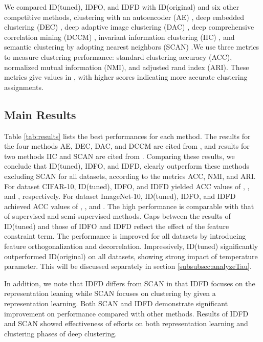 \documentclass{article} \usepackage{iclr2021_conference,times}
\begin{document}
We compared ID(tuned), IDFO, and IDFD with ID(original) and six other competitive methods, clustering with an autoencoder (AE) \cite{hinton2006reducing}, deep embedded clustering (DEC) \cite{DEC}, deep adaptive image clustering (DAC) \cite{DAC}, deep comprehensive correlation mining (DCCM) \cite{DCCM}, invariant information clustering (IIC) \cite{IIC}, and semantic clustering by adopting nearest neighbors (SCAN) \cite{SCAN} .We use three metrics to measure clustering performance: standard clustering accuracy (ACC), normalized mutual information (NMI), and adjusted rand index (ARI). These metrics give values in , with higher scores indicating more accurate clustering assignments. 

\subsection{Main Results}
\label{results}
Table \ref{tab:results} lists the best performances for each method. The results for the four methods AE, DEC, DAC, and DCCM are cited from \cite{DCCM}, and results for two methods IIC and SCAN are cited from \cite{SCAN}. Comparing these results, we conclude that ID(tuned), IDFO, and IDFD, clearly outperform these methods excluding SCAN for all datasets, according to the metrics ACC, NMI, and ARI.  
For dataset CIFAR-10, ID(tuned), IDFO, and IDFD yielded ACC values of , , and , respectively.
For dataset ImageNet-10, ID(tuned), IDFO, and IDFD achieved ACC values of , , and . The high performance is comparable with that of supervised and semi-supervised methods.
Gaps between the results of ID(tuned) and those of IDFO and IDFD reflect the effect of the feature constraint term. The performance is improved for all datasets by introducing feature orthogonalization and decorrelation.
Impressively, ID(tuned) significantly outperformed ID(original) on all datasets, showing strong impact of temperature parameter. This will be discussed separately in section \ref{subsubsec:analyzeTau}. 

In addition, we note that IDFD differs from SCAN in that IDFD focuses on the representation leaning while SCAN focuses on clustering by given a representation learning. Both SCAN and IDFD demonstrate significant improvement on performance compared with other methods. Results of IDFD and SCAN showed effectiveness of efforts on both representation learning and clustering phases of deep clustering.
\end{document}

